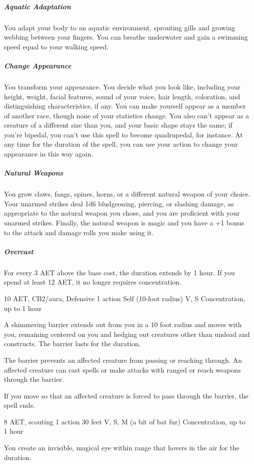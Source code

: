 \subparagraph*{Aquatic Adaptation} You adapt your body to an aquatic environment, sprouting gills and growing webbing between your fingers. You can breathe underwater and gain a swimming speed equal to your walking speed.

\subparagraph*{Change Appearance} You transform your appearance. You decide what you look like, including your height, weight, facial features, sound of your voice, hair length, coloration, and distinguishing characteristics, if any. You can make yourself appear as a member of another race, though none of your statistics change. You also can't appear as a creature of a different size than you, and your basic shape stays the same; if you're bipedal, you can't use this spell to become quadrupedal, for instance. At any time for the duration of the spell, you can use your action to change your appearance in this way again.

\subparagraph*{Natural Weapons} You grow claws, fangs, spines, horns, or a different natural weapon of your choice. Your unarmed strikes deal 1d6 bludgeoning, piercing, or slashing damage, as appropriate to the natural weapon you chose, and you are proficient with your unarmed strikes. Finally, the natural weapon is magic and you have a +1 bonus to the attack and damage rolls you make using it.

\subparagraph*{Overcast} For every 3 AET above the base cost, the duration extends by 1 hour. If you spend at least 12 AET, it no longer requires concentration.


{10 AET, CB2/aura, Defensive}
{1 action}
{Self (10-foot radius)}
{V, S}
{Concentration, up to 1 hour}

A shimmering barrier extends out from you in a 10 foot radius and moves with you, remaining centered on you and hedging out creatures other than undead and constructs. The barrier lasts for the duration.

The barrier prevents an affected creature from passing or reaching through. An affected creature can cast spells or make attacks with ranged or reach weapons through the barrier.

If you move so that an affected creature is forced to pass through the barrier, the spell ends.


{8 AET, scouting}
{1 action}
{30 feet}
{V, S, M (a bit of bat fur)}
{Concentration, up to 1 hour}

You create an invisible, magical eye within range that hovers in the air for the duration.

